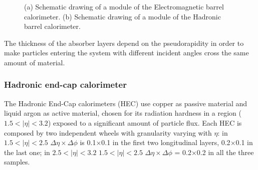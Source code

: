 \begin{figure}[tb]\begin{center}
	\caption{(a) Schematic drawing of a module of the Electromagnetic barrel calorimeter. 
        (b) Schematic drawing of a module of the Hadronic barrel calorimeter.}
\end{center}\end{figure}

The thickness of the absorber layers depend on the pseudorapidity in
order to make particles entering the system with different incident 
angles cross the same amount of material.

\subsubsection{Hadronic end-cap calorimeter}\label{sec:hadcalendcap}

The Hadronic End-Cap calorimeters (HEC) use copper as passive material and liquid
argon as active material, chosen for its radiation hardness in a region ($1.5<|\eta|<3.2$)
exposed to a significant amount of particle flux. Each HEC is composed by
two independent wheels with granularity varying with $\eta$: 
in $1.5<|\eta|<2.5$ $\Delta\eta\times\Delta\phi$ is 0.1$\times$0.1 in the first
two longitudinal layers,  0.2$\times$0.1 in the last one; in
$2.5<|\eta|<3.2$ $1.5<|\eta|<2.5$ $\Delta\eta\times\Delta\phi$ = 0.2$\times$0.2
in all the three samples.

